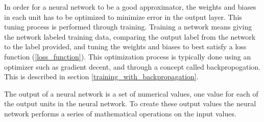 In order for a neural network to be a good approximator, the weights and biases in each unit has to be optimized to minimize error in the output layer. This tuning process is performed through training. Training a network means giving the network labeled training data, comparing the output label from the network to the label provided, and tuning the weights and biases to best satisfy a loss function (\ref{loss_function}). This optimization process is typically done using an optimizer such as gradient decent, and through a concept called backpropogation. This is described in section \ref{training_with_backpropagation}.

The output of a neural network is a set of numerical values, one value for each of the output units in the neural network. To create these output values the neural network performs a series of mathematical operations on the input values.

